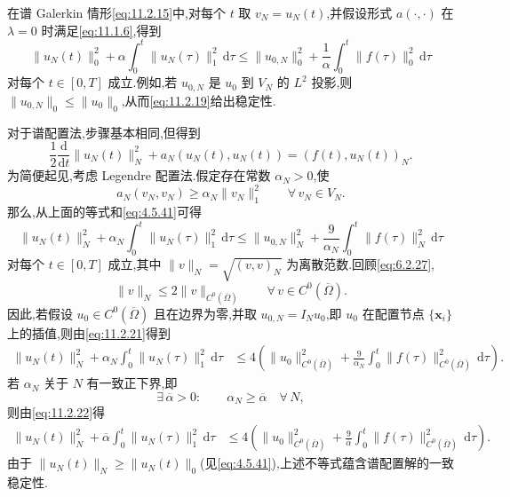 在谱 Galerkin 情形\eqref{eq:11.2.15}中,对每个 \(t\) 取 \(v_N=u_N(t)\),并假设形式 \(a(\cdot,\cdot)\) 在 \(\lambda=0\) 时满足\eqref{eq:11.1.6},得到
\begin{equation}\label{eq:11.2.19}
  \|u_N(t)\|_0^2+\alpha\int_0^t\|u_N(\tau)\|_1^2\,\mathrm d\tau
    \le\|u_{0,N}\|_0^2+\frac1\alpha\int_0^t\|f(\tau)\|_0^2\,\mathrm d\tau
\end{equation}
对每个 \(t\in[0,T]\) 成立.例如,若 \(u_{0,N}\) 是 \(u_0\) 到 \(V_N\) 的 \(L^2\) 投影,则 \(\|u_{0,N}\|_0\le\|u_0\|_0\),从而\eqref{eq:11.2.19}给出稳定性.

对于谱配置法,步骤基本相同,但得到
\[
  \frac12\frac{\mathrm d}{\mathrm dt}\|u_N(t)\|_N^2+a_N(u_N(t),u_N(t))
     =(f(t),u_N(t))_N.
\]
为简便起见,考虑 Legendre 配置法.假定存在常数 \(\alpha_N>0\),使
\begin{equation}\label{eq:11.2.20}
  a_N(v_N,v_N)\ge\alpha_N\|v_N\|_1^2\qquad\forall\,v_N\in V_N.
\end{equation}
那么,从上面的等式和\eqref{eq:4.5.41}可得
\begin{equation}\label{eq:11.2.21}
  \|u_N(t)\|_N^2+\alpha_N\int_0^t\|u_N(\tau)\|_1^2\,\mathrm d\tau
    \le\|u_{0,N}\|_N^2+\frac9{\alpha_N}\int_0^t\|f(\tau)\|_N^2\,\mathrm d\tau
\end{equation}
对每个 \(t\in[0,T]\) 成立,其中 \(\|v\|_N=\sqrt{(v,v)_N}\) 为离散范数.回顾\eqref{eq:6.2.27},
\[
  \|v\|_N\le2\|v\|_{C^0(\overline\Omega)}\qquad\forall\,v\in C^0(\overline\Omega).
\]
因此,若假设 \(u_0\in C^0(\overline\Omega)\) 且在边界为零,并取 \(u_{0,N}=I_Nu_0\),即 \(u_0\) 在配置节点 \(\{\boldsymbol{x}_i\}\) 上的插值,则由\eqref{eq:11.2.21}得到
\begin{equation}\label{eq:11.2.22}
  \begin{aligned}
    \|u_N(t)\|_N^2+\alpha_N\int_0^t\|u_N(\tau)\|_1^2\,\mathrm d\tau
       &\le4\left(\|u_0\|_{C^0(\overline\Omega)}^2
            +\frac9{\alpha_N}\int_0^t\|f(\tau)\|_{C^0(\overline\Omega)}^2\,\mathrm d\tau\right).
  \end{aligned}
\end{equation}
若 \(\alpha_N\) 关于 \(N\) 有一致正下界,即
\begin{equation}\label{eq:11.2.23}
  \exists\,\overline\alpha>0:\qquad \alpha_N\ge\overline\alpha\quad\forall\,N,
\end{equation}
则由\eqref{eq:11.2.22}得
\begin{equation}\label{eq:11.2.24}
  \begin{aligned}
    \|u_N(t)\|_N^2+\overline\alpha\int_0^t\|u_N(\tau)\|_1^2\,\mathrm d\tau
       &\le4\left(\|u_0\|_{C^0(\overline\Omega)}^2
          +\frac9{\overline\alpha}\int_0^t\|f(\tau)\|_{C^0(\overline\Omega)}^2\,\mathrm d\tau\right).
  \end{aligned}
\end{equation}
由于 \(\|u_N(t)\|_N\ge\|u_N(t)\|_0\)(见\eqref{eq:4.5.41}),上述不等式蕴含谱配置解的一致稳定性.

